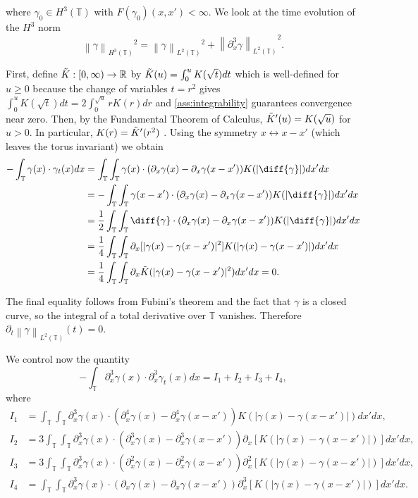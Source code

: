 \documentclass[a4paper]{amsart}
\theoremstyle{definition}
\newcommand{\R}{\ensuremath{\mathbb{R}}}
\newcommand{\T}{\ensuremath{\mathbb{T}}}
\newcommand{\Lp}[2][2]{\ensuremath{\left\|#2\right\|_{L^#1(\T)}}}
\newcommand{\Hs}[1]{\ensuremath{\left\|#1\right\|_{H^3(\T)}}}
\newcommand{\intTT}{\ensuremath{\int_\T\int_\T}}
\begin{document}
where $\gamma_0\in H^3(\T)$ with $F(\gamma_0)(x,x')<\infty.$ We look at the time evolution of the $H^3$ norm $$\Hs{\gamma}^2=\Lp{\gamma}^2+\Lp{\partial_x^3\gamma }^2.$$

First, define $\Tilde{K}:[0,\infty)\to \R$ by $\Tilde{K}(u)=\int_0^{u} K(\sqrt{t})dt$ which is well-defined for $u\geq 0$ because the change of variables $t=r^2$ gives $\int_0^{u} K(\sqrt{t})dt=2\int_0^{\sqrt{u}} rK(r)dr$ and \ref{ass:integrability} guarantees convergence near zero. Then, by the Fundamental Theorem of Calculus, $\Tilde{K}'(u)=K(\sqrt{u})$ for $u>0.$ In particular, $K(r)=\Tilde{K}'(r^2)$ . Using the symmetry $x\leftrightarrow x-x'$ (which leaves the torus invariant) we obtain
\begin{equation}
\begin{aligned}
    -\int_\T \gamma(x) \cdot \gamma_t(x)dx &= \intTT \gamma(x) \cdot (\partial_x\gamma(x)-\partial_x\gamma(x-x'))K(|\diff{\gamma}|)dx'dx \\
    &= -\int_\T\int_\T \gamma(x-x') \cdot (\partial_x\gamma(x)-\partial_x\gamma(x-x'))K(|\diff{\gamma}|)dx'dx \\
    &= \frac{1}{2}\int_\T\int_\T \diff{\gamma}\cdot(\partial_x\gamma(x)-\partial_x\gamma(x-x'))K(|\diff{\gamma}|)dx'dx \\
    &= \frac{1}{4} \int_\T\int_\T \partial_x [|\gamma(x)-\gamma(x-x')|^2]K(|\gamma(x)-\gamma(x-x')|)dx'dx \\
    &= \frac{1}{4} \int_\T\int_\T \partial_x \Tilde{K}(|\gamma(x)-\gamma(x-x')|^2) dx'dx = 0.
\end{aligned}\label{eq:gammaL2}
\end{equation}

The final equality follows from Fubini's theorem and the fact that $\gamma$ is a closed curve, so the integral of a total derivative over $\mathbb{T}$ vanishes. Therefore $\partial_t\Lp{\gamma}(t)=0.$ 

We control now the quantity $$-\int_\T \partial_x^3\gamma(x)\cdot \partial_x^3\gamma_t(x)dx= I_1+ I_2+ I_3+ I_4,$$ where 
\begin{align*}
    I_1&=\int_\T\int_\T\partial_x^3\gamma(x)\cdot(\partial_x^4\gamma(x)-\partial_x^4\gamma(x-x'))K(|\gamma(x)-\gamma(x-x')|)dx'dx,\\ 
    I_2&=3\int_\T\int_\T\partial_x^3\gamma(x)\cdot(\partial_x^3\gamma(x)-\partial_x^3\gamma(x-x'))\partial_x[K(|\gamma(x)-\gamma(x-x')|)]dx'dx,\\
    I_3&=3\int_\T\int_\T\partial_x^3\gamma(x)\cdot(\partial_x^2\gamma(x)-\partial_x^2\gamma(x-x'))\partial_x^2[K(|\gamma(x)-\gamma(x-x')|)]dx'dx,\\
    I_4&=\int_\T\int_\T\partial_x^3\gamma(x)\cdot(\partial_x\gamma(x)-\partial_x\gamma(x-x'))\partial_x^3[K(|\gamma(x)-\gamma(x-x')|)]dx'dx.
\end{align*}
\end{document}
